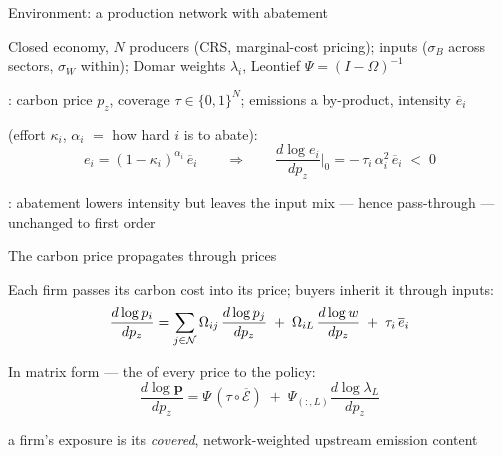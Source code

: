 \begin{frame}{Environment: a production network with abatement}

    \begin{wideitemize}
        \item Closed economy, $N$ producers (CRS, marginal-cost pricing);  inputs ($\sigma_B$ across sectors, $\sigma_W$ within); Domar weights $\lambda_i$, Leontief $\Psi=(I-\Omega)^{-1}$

        \item \textbf{}: carbon price $p_z$, coverage $\tau\in\{0,1\}^N$; emissions a by-product, intensity $\overline{e}_i$

        \item \textbf{} (effort $\kappa_i$, $\alpha_i$ $=$ how hard $i$ is to abate):
        $$ e_i = (1-\kappa_i)^{\alpha_i}\,\overline{e}_i
            \qquad\Longrightarrow\qquad
            \frac{d \log e_i}{d p_z}\bigg|_{0} = -\,\tau_i\,\alpha_i^2\,\overline{e}_i \;<\;0 $$

        \item \textbf{}: abatement lowers intensity but leaves the input mix --- hence pass-through --- unchanged to first order
    \end{wideitemize}

\end{frame}

\begin{frame}{The carbon price propagates through prices}

    \begin{wideitemize}
        \item Each firm passes its carbon cost into its price; buyers inherit it through inputs:
        $$ \frac{d \log p_i}{d p_z} = \sum_{j\in\mathcal{N}}\Omega_{ij}\,\frac{d \log p_j}{d p_z} \;+\; \Omega_{iL}\,\frac{d \log w}{d p_z} \;+\; \tau_i\,\overline{e}_i $$

        \item In matrix form --- the  of every price to the policy:
        $$ \frac{d \log \mathbf{p}}{d p_z} = \Psi\,(\tau \circ \overline{\mathcal{E}}) \;+\; \Psi_{(:,L)}\frac{d \log \lambda_L}{d p_z} $$

        \item[] \alertg{$\Rightarrow$} a firm's exposure is its \emph{covered}, network-weighted upstream emission content
    \end{wideitemize}

\end{frame}


